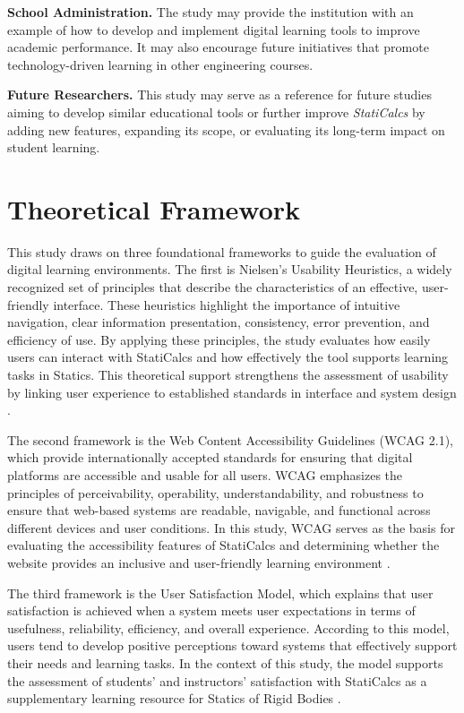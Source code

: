 \medskip
\textbf{School Administration.} The study may provide the institution with an example of how to develop and implement digital learning tools to improve academic performance. It may also encourage future initiatives that promote technology-driven learning in other engineering courses.

\medskip
\textbf{Future Researchers.} This study may serve as a reference for future studies aiming to develop similar educational tools or further improve \textit{StatiCalcs} by adding new features, expanding its scope, or evaluating its long-term impact on student learning.

\section{Theoretical Framework}\label{sec:1-tf}

This study draws on three foundational frameworks to guide the evaluation of digital learning environments. The first is Nielsen’s Usability Heuristics, a widely recognized set of principles that describe the characteristics of an effective, user-friendly interface. These heuristics highlight the importance of intuitive navigation, clear information presentation, consistency, error prevention, and efficiency of use. By applying these principles, the study evaluates how easily users can interact with StatiCalcs and how effectively the tool supports learning tasks in Statics. This theoretical support strengthens the assessment of usability by linking user experience to established standards in interface and system design \autocite{nielsen_10_1994}.

The second framework is the Web Content Accessibility Guidelines (WCAG 2.1), which provide internationally accepted standards for ensuring that digital platforms are accessible and usable for all users. WCAG emphasizes the principles of perceivability, operability, understandability, and robustness to ensure that web-based systems are readable, navigable, and functional across different devices and user conditions. In this study, WCAG serves as the basis for evaluating the accessibility features of StatiCalcs and determining whether the website provides an inclusive and user-friendly learning environment \autocite{world_wide_web_consortium_w3c_web_nodate}.

The third framework is the User Satisfaction Model, which explains that user satisfaction is achieved when a system meets user expectations in terms of usefulness, reliability, efficiency, and overall experience. According to this model, users tend to develop positive perceptions toward systems that effectively support their needs and learning tasks. In the context of this study, the model supports the assessment of students’ and instructors’ satisfaction with StatiCalcs as a supplementary learning resource for Statics of Rigid Bodies \autocite{johnson_customer_2001}.


